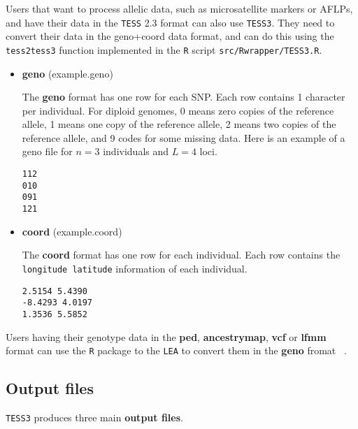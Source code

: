 \documentclass[10pt,a4paper]{article}
\begin{document}
Users that want to process allelic data, such as microsatellite markers or AFLPs, and have their data in the {\tt TESS} 2.3 format can also use {\tt TESS3}. They need to convert their data in the geno+coord data format, and can do this using the {\tt tess2tess3} function implemented in the {\tt R} script {\tt src/Rwrapper/TESS3.R}.




\begin{itemize}
\item {\bf geno} (example.geno)

The {\bf geno} format has one row for each SNP. Each row contains 1 character per individual. For diploid genomes,  0 means zero copies of the reference allele, 1 means one copy of the reference allele, 2 means two copies of the reference allele, and 9 codes for some missing data. Here is an example of a geno file for $n=3$ individuals and $L=4$ loci.
\begin{center}
\footnotesize
\begin{Verbatim}[frame=single]
112
010
091
121
\end{Verbatim}
\end{center}


\item {\bf coord} (example.coord)

The {\bf coord} format has one row for each individual. Each row contains the \verb|longitude latitude| information of each individual.

\begin{center}
\footnotesize
\begin{Verbatim}[frame=single]
2.5154 5.4390
-8.4293 4.0197
1.3536 5.5852
\end{Verbatim}
\end{center}

\end{itemize}

\noindent Users having their genotype data in the {\bf ped}, {\bf ancestrymap}, {\bf vcf} or {\bf lfmm} format  can use the {\tt R} package to the {\tt LEA} to convert them in the {\bf geno} fromat ~\cite{frichot2015lea}. 

\subsection{Output files}

{\tt TESS3} produces three main {\bf output files}.
\end{document}
